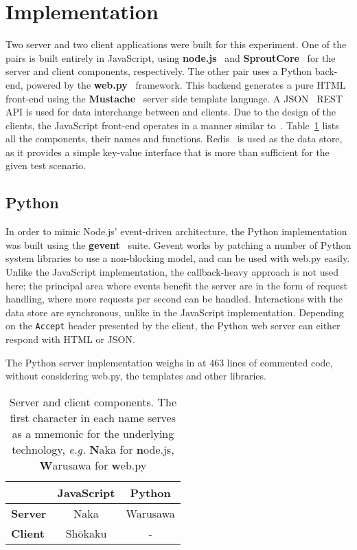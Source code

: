 \section{\label{sec:impl}Implementation}

Two server and two client applications were built for this experiment. One of the pairs is built entirely in JavaScript, using \textbf{node.js}~\cite{node} and \textbf{SproutCore}~\cite{sprout} for the server and client components, respectively. The other pair uses a Python back-end, powered by the \textbf{web.py}~\cite{webpy} framework. This backend generates a pure HTML front-end using the \textbf{Mustache}~\cite{mustache} server side template language. A JSON~\cite{rfc4627} REST API is used for data interchange between and clients. Due to the design of the clients, the JavaScript front-end operates in a manner similar to~\cite{flyhtml}. Table~\ref{tab:comps} lists all the components, their names and functions. Redis~\cite{redis} is used as the data store, as it provides a simple key-value interface that is more than sufficient for the given test scenario.

\subsection{\label{sec:impl:pyhtml}Python}

In order to mimic Node.js' event-driven architecture, the Python implementation was built using the \textbf{gevent}~\cite{gevent} suite. Gevent works by patching a number of Python system libraries to use a non-blocking model, and can be used with web.py easily. Unlike the JavaScript implementation, the callback-heavy approach is not used here; the principal area where events benefit the server are in the form of request handling, where more requests per second can be handled. Interactions with the data store are synchronous, unlike in the JavaScript implementation. Depending on the \texttt{Accept} header presented by the client, the Python web server can either respond with HTML or JSON.

The Python server implementation weighs in at 463 lines of commented code, without considering web.py, the templates and other libraries.

\begin{table}
    \begin{center}
        \begin{tabular}{l c c}
            \toprule
            & \textbf{JavaScript} & \textbf{Python} \\
            \midrule
            \textbf{Server} & Naka & Warusawa \\
            \textbf{Client} & Sh\={o}kaku & - \\
            \bottomrule
        \end{tabular}
        \caption{Server and client components. The first character in each name serves as a mnemonic for the underlying technology, \emph{e.g.} \textbf{N}aka for \textbf{n}ode.js, \textbf{W}arusawa for \textbf{w}eb.py}
        \label{tab:comps}
    \end{center}
\end{table}


